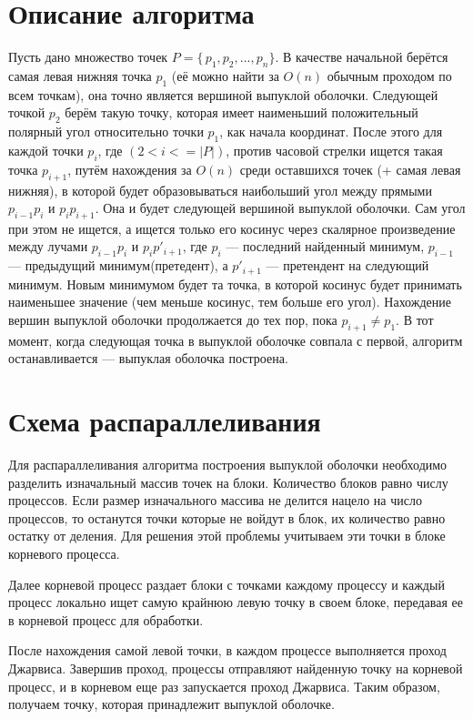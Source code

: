 \documentclass{report}
\begin{document}
\section*{Описание алгоритма}
Пусть дано множество точек $P=\{\,p_1, p_2, ..., p_n\}$. В качестве начальной берётся самая левая нижняя точка $p_1$ (её можно найти за $O(n)$ обычным проходом по всем точкам), она точно является вершиной выпуклой оболочки. Следующей точкой  $p_2$ берём такую точку, которая имеет наименьший положительный полярный угол относительно точки $p_1$, как начала координат. После этого для каждой точки $p_i$, где $(2<i<=|P|)$, против часовой стрелки ищется такая точка $p_{i+1}$, путём нахождения за $O(n)$ среди оставшихся точек (+ самая левая нижняя), в которой будет образовываться наибольший угол между прямыми $p_{i-1} p_i$ и $p_{i}p_{i+1}$. Она и будет следующей вершиной выпуклой оболочки. Сам угол при этом не ищется, а ищется только его косинус через скалярное произведение между лучами  $p_{i-1}p_{i}$ и $p_{i}p'_{i+1}$, где  $p_{i}$ — последний найденный минимум,  $p_{i-1}$ — предыдущий минимум(претедент), а $p'_{i+1}$ — претендент на следующий минимум. Новым минимумом будет та точка, в которой косинус будет принимать наименьшее значение (чем меньше косинус, тем больше его угол). Нахождение вершин выпуклой оболочки продолжается до тех пор, пока $p_{i+1}\neq p_{1}$. В тот момент, когда следующая точка в выпуклой оболочке совпала с первой, алгоритм останавливается — выпуклая оболочка построена.
\newpage

\section*{Схема распараллеливания}
Для распараллеливания алгоритма построения выпуклой оболочки необходимо разделить изначальный массив точек на блоки. Количество блоков равно числу процессов. Если размер изначального массива не делится нацело на число процессов, то останутся точки которые не войдут в блок, их количество равно остатку от деления. Для решения этой проблемы учитываем эти точки в блоке корневого процесса.
\par
Далее корневой процесс раздает блоки с точками каждому процессу и каждый процесс локально ищет самую крайнюю левую точку в своем блоке, передавая ее в корневой процесс для обработки.
\par
После нахождения самой левой точки, в каждом процессе выполняется проход Джарвиса. Завершив проход, процессы отправляют найденную точку на корневой процесс, и в корневом еще раз запускается проход Джарвиса. Таким образом, получаем точку, которая принадлежит выпуклой оболочке.  
\newpage
\end{document}
